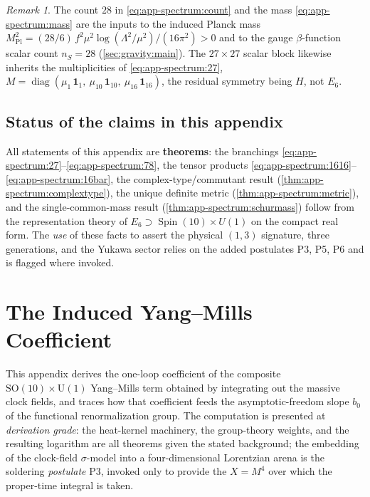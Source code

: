 \documentclass[11pt]{article}
\theoremstyle{plain}
\theoremstyle{definition}
\theoremstyle{remark}
\newtheorem{remark}[theorem]{Remark}
\newcommand{\SO}[1]{\mathrm{SO}(#1)}
\newcommand{\U}[1]{\mathrm{U}(#1)}
\newcommand{\Spin}{\operatorname{Spin}}
\newcommand{\diag}{\operatorname{diag}}
\newcommand{\SOTen}{\SO{10}}
\newcommand{\UOne}{\U{1}}
\begin{document}
\begin{remark}\label{rem:app-spectrum:downstream}
The count $28$ in \eqref{eq:app-spectrum:count} and the mass
\eqref{eq:app-spectrum:mass} are the inputs to the induced Planck mass
$M_{\mathrm{Pl}}^2=(28/6)\,f^2\mu^2\log(\Lambda^2/\mu^2)/(16\pi^2)>0$ and
to the gauge $\beta$-function scalar count $n_S=28$
(\autoref{sec:gravity:main}). The $27\times27$ scalar block likewise
inherits the multiplicities of \eqref{eq:app-spectrum:27},
$M=\diag(\mu_1\,\mathbf 1_1,\ \mu_{10}\,\mathbf 1_{10},\
\mu_{16}\,\mathbf 1_{16})$, the residual symmetry being $H$, not $E_6$.
\end{remark}

\subsection*{Status of the claims in this appendix}
\label{sec:app-spectrum:status}

All statements of this appendix are \textbf{theorems}: the branchings
\eqref{eq:app-spectrum:27}--\eqref{eq:app-spectrum:78}, the tensor
products \eqref{eq:app-spectrum:1616}--\eqref{eq:app-spectrum:16bar}, the
complex-type/commutant result (\autoref{thm:app-spectrum:complextype}),
the unique definite metric (\autoref{thm:app-spectrum:metric}), and the
single-common-mass result (\autoref{thm:app-spectrum:schurmass}) follow
from the representation theory of $E_6\supset\Spin(10)\times U(1)$ on the
compact real form. The \emph{use} of these facts to assert the physical
$(1,3)$ signature, three generations, and the Yukawa sector relies on the
added postulates P3, P5, P6 and is flagged where invoked.
\section{The Induced Yang--Mills Coefficient}
\label{sec:app-ym:main}

This appendix derives the one-loop coefficient of the composite
$\SOTen\times\UOne$ Yang--Mills term obtained by integrating out the
massive clock fields, and traces how that coefficient feeds the
asymptotic-freedom slope $b_{0}$ of the functional renormalization group.
The computation is presented at \emph{derivation grade}: the heat-kernel
machinery, the group-theory weights, and the resulting logarithm are all
theorems given the stated background; the embedding of the clock-field
$\sigma$-model into a four-dimensional Lorentzian arena is the soldering
\emph{postulate} P3, invoked only to provide the $X=M^{4}$ over which the
proper-time integral is taken.
\end{document}
